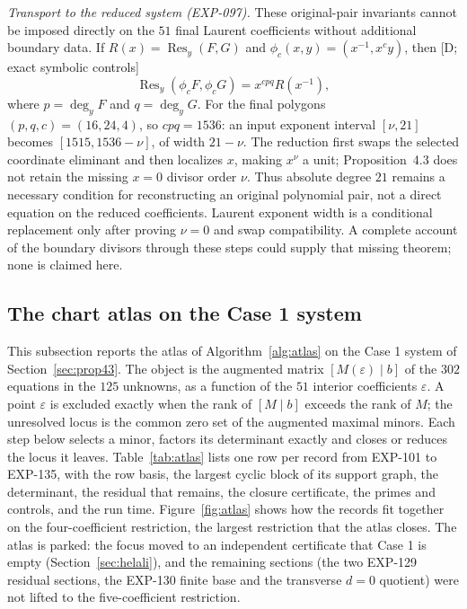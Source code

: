 \documentclass[11pt]{article}
\theoremstyle{remark}
\begin{document}
\emph{Transport to the reduced system (EXP-097).} These original-pair invariants
cannot be imposed directly on the $51$ final Laurent coefficients without
additional boundary data. If $R(x)=\operatorname{Res}_y(F,G)$ and
\(\phi_c(x,y)=(x^{-1},x^cy)\), then [D; exact symbolic controls]
\[
 \operatorname{Res}_y(\phi_cF,\phi_cG)=x^{cpq}R(x^{-1}),
\]
where $p=\deg_yF$ and $q=\deg_yG$. For the final polygons
$(p,q,c)=(16,24,4)$, so $cpq=1536$: an input exponent interval
$[\nu,21]$ becomes $[1515,1536-\nu]$, of width $21-\nu$.
The reduction first swaps the selected coordinate eliminant and then
localizes $x$, making $x^\nu$ a unit; Proposition~4.3 does not retain the
missing $x=0$ divisor order $\nu$. Thus absolute degree $21$ remains a
necessary condition for reconstructing an original polynomial pair, not a direct
equation on the reduced coefficients. Laurent exponent width is a conditional
replacement only after proving $\nu=0$ and swap compatibility. A complete account
of the boundary divisors through these steps could supply that missing theorem;
none is claimed here.

\subsection{The chart atlas on the Case 1 system}\label{sec:atlas}

This subsection reports the atlas of Algorithm~\ref{alg:atlas} on the Case 1 system of Section~\ref{sec:prop43}. The
object is the augmented matrix $[M(\varepsilon)\mid b]$ of the $302$ equations in the $125$ unknowns, as a function of the
$51$ interior coefficients $\varepsilon$. A point $\varepsilon$ is excluded exactly when the rank of
$[M\mid b]$ exceeds the rank of $M$; the unresolved locus is the common zero set of the augmented maximal minors. Each
step below selects a minor, factors its determinant exactly and closes or reduces the locus it leaves.
Table~\ref{tab:atlas} lists one row per record from EXP-101 to EXP-135, with the row basis, the largest cyclic block of its support
graph, the determinant, the residual that remains, the closure certificate, the primes and controls, and the run time.
Figure~\ref{fig:atlas} shows how the records fit together on the four-coefficient restriction, the largest restriction that
the atlas closes. The atlas is parked: the focus moved to an independent certificate that Case 1 is empty
(Section~\ref{sec:helali}), and the remaining sections (the two EXP-129 residual sections, the EXP-130 finite base and the
transverse $d=0$ quotient) were not lifted to the five-coefficient restriction.
\end{document}
